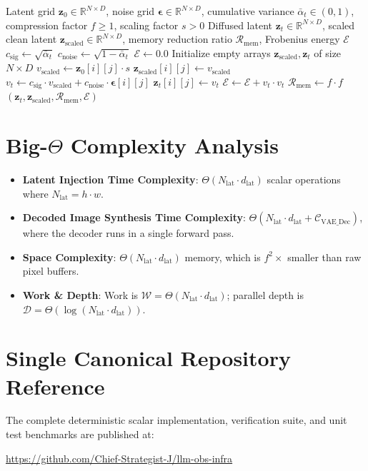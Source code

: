 \documentclass[11pt,a4paper]{article}
\theoremstyle{definition}
\begin{document}
\begin{algorithm}[H]
\caption{Latent Diffusion Spatial Scaling and Marginal Forward Injection}
\begin{algorithmic}[1]
\Require Latent grid $\mathbf{z}_0 \in \mathbb{R}^{N \times D}$, noise grid $\boldsymbol{\epsilon} \in \mathbb{R}^{N \times D}$, cumulative variance $\bar{\alpha}_t \in (0, 1)$, compression factor $f \ge 1$, scaling factor $s > 0$
\Ensure Diffused latent $\mathbf{z}_t \in \mathbb{R}^{N \times D}$, scaled clean latent $\mathbf{z}_{\text{scaled}} \in \mathbb{R}^{N \times D}$, memory reduction ratio $\mathcal{R}_{\text{mem}}$, Frobenius energy $\mathcal{E}$
\State $c_{\text{sig}} \gets \sqrt{\bar{\alpha}_t}$
\State $c_{\text{noise}} \gets \sqrt{1 - \bar{\alpha}_t}$
\State $\mathcal{E} \gets 0.0$
\State Initialize empty arrays $\mathbf{z}_{\text{scaled}}, \mathbf{z}_t$ of size $N \times D$
        \State $v_{\text{scaled}} \gets \mathbf{z}_0[i][j] \cdot s$
        \State $\mathbf{z}_{\text{scaled}}[i][j] \gets v_{\text{scaled}}$
        \State $v_t \gets c_{\text{sig}} \cdot v_{\text{scaled}} + c_{\text{noise}} \cdot \boldsymbol{\epsilon}[i][j]$
        \State $\mathbf{z}_t[i][j] \gets v_t$
        \State $\mathcal{E} \gets \mathcal{E} + v_t \cdot v_t$
    \EndFor
\EndFor
\State $\mathcal{R}_{\text{mem}} \gets f \cdot f$
\State \Return $(\mathbf{z}_t, \mathbf{z}_{\text{scaled}}, \mathcal{R}_{\text{mem}}, \mathcal{E})$
\end{algorithmic}
\end{algorithm}

\section{Big-$\Theta$ Complexity Analysis}

\begin{itemize}
    \item \textbf{Latent Injection Time Complexity}: $\Theta(N_{\text{lat}} \cdot d_{\text{lat}})$ scalar operations where $N_{\text{lat}} = h \cdot w$.
    \item \textbf{Decoded Image Synthesis Time Complexity}: $\Theta(N_{\text{lat}} \cdot d_{\text{lat}} + \mathcal{C}_{\text{VAE\_Dec}})$, where the decoder runs in a single forward pass.
    \item \textbf{Space Complexity}: $\Theta(N_{\text{lat}} \cdot d_{\text{lat}})$ memory, which is $f^2\times$ smaller than raw pixel buffers.
    \item \textbf{Work \& Depth}: Work is $\mathcal{W} = \Theta(N_{\text{lat}} \cdot d_{\text{lat}})$; parallel depth is $\mathcal{D} = \Theta(\log(N_{\text{lat}} \cdot d_{\text{lat}}))$.
\end{itemize}

\section{Single Canonical Repository Reference}

The complete deterministic scalar implementation, verification suite, and unit test benchmarks are published at:
\begin{center}
\url{https://github.com/Chief-Strategist-J/llm-obs-infra}
\end{center}
\end{document}
